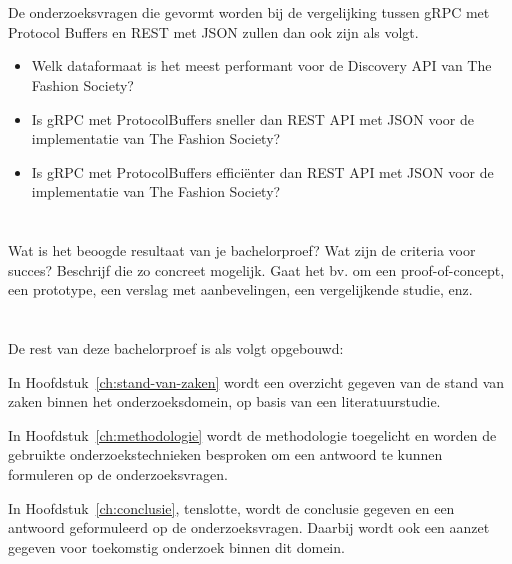 \section{}
\label{sec:onderzoeksvraag}

De onderzoeksvragen die gevormt worden bij de vergelijking tussen gRPC met Protocol Buffers en REST met JSON zullen dan ook zijn als volgt.
\begin{itemize}
    \item Welk dataformaat is het meest performant voor de Discovery API van The Fashion Society?
    \item Is gRPC met ProtocolBuffers sneller dan REST API met JSON voor de implementatie van The Fashion Society?
    \item Is gRPC met ProtocolBuffers efficiënter dan REST API met JSON voor de implementatie van The Fashion Society?
\end{itemize}

\section{}
\label{sec:onderzoeksdoelstelling}

Wat is het beoogde resultaat van je bachelorproef? Wat zijn de criteria voor succes? Beschrijf die zo concreet mogelijk. Gaat het bv. om een proof-of-concept, een prototype, een verslag met aanbevelingen, een vergelijkende studie, enz.

\section{}
\label{sec:opzet-bachelorproef}


De rest van deze bachelorproef is als volgt opgebouwd:

In Hoofdstuk~\ref{ch:stand-van-zaken} wordt een overzicht gegeven van de stand van zaken binnen het onderzoeksdomein, op basis van een literatuurstudie.

In Hoofdstuk~\ref{ch:methodologie} wordt de methodologie toegelicht en worden de gebruikte onderzoekstechnieken besproken om een antwoord te kunnen formuleren op de onderzoeksvragen.


In Hoofdstuk~\ref{ch:conclusie}, tenslotte, wordt de conclusie gegeven en een antwoord geformuleerd op de onderzoeksvragen. Daarbij wordt ook een aanzet gegeven voor toekomstig onderzoek binnen dit domein.
